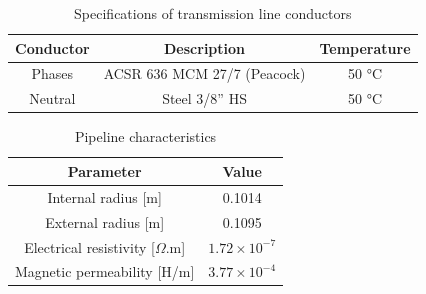 \documentclass[conference]{IEEEtran}
\begin{document}
	\begin{table}[!hbt]
		\renewcommand{\arraystretch}{1.3}
		\caption{Specifications of transmission line conductors}
		\label{table:LTCond}
		\centering
		\begin{tabular}{|c|c|c|}
			\hline
			\textbf{Conductor} & \textbf{Description} & \textbf{Temperature} \\
			\hline
			Phases & ACSR 636 MCM 27/7 (Peacock) & 50 °C\\
			\hline
			Neutral & Steel 3/8” HS & 50 °C\\
			\hline
		\end{tabular}
	\end{table}
	
	\begin{table}[!hbt]
		\renewcommand{\arraystretch}{1.3}
		\caption{Pipeline characteristics}
		\label{table:PipeParam}
		\centering
		\begin{tabular}{|c|c|}
			\hline
			\textbf{Parameter} & \textbf{Value} \\
			\hline
			Internal radius [m] & 0.1014\\
			\hline
			External radius [m] & 0.1095\\
			\hline
			Electrical resistivity [$\Omega$.m] & $1.72\times10^{-7}$\\
			\hline
			Magnetic permeability [H/m] & $3.77\times10^{-4}$\\
			\hline
		\end{tabular}
	\end{table}
	
	
	
	
\end{document}
